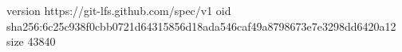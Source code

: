 version https://git-lfs.github.com/spec/v1
oid sha256:6c25c938f0cbb0721d64315856d18ada546caf49a8798673e7e3298dd6420a12
size 43840
